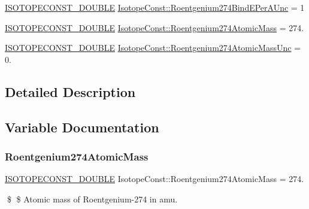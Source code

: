 \begin{DoxyCompactItemize}
\item 
\mbox{\hyperlink{group___isotope_const-_macros_ga8f45a7272ce02c0b4c65c44636ed719a}{I\+S\+O\+T\+O\+P\+E\+C\+O\+N\+S\+T\+\_\+\+D\+O\+U\+B\+LE}} \mbox{\hyperlink{group___isotope_const-_roentgenium-_rg274_gad23f713fd349c5394e547ced151ece70}{Isotope\+Const\+::\+Roentgenium274\+Bind\+E\+Per\+A\+Unc}} = 1
\item 
\mbox{\hyperlink{group___isotope_const-_macros_ga8f45a7272ce02c0b4c65c44636ed719a}{I\+S\+O\+T\+O\+P\+E\+C\+O\+N\+S\+T\+\_\+\+D\+O\+U\+B\+LE}} \mbox{\hyperlink{group___isotope_const-_roentgenium-_rg274_gacc34fede506164a9ad70de76603180a5}{Isotope\+Const\+::\+Roentgenium274\+Atomic\+Mass}} = 274.
\item 
\mbox{\hyperlink{group___isotope_const-_macros_ga8f45a7272ce02c0b4c65c44636ed719a}{I\+S\+O\+T\+O\+P\+E\+C\+O\+N\+S\+T\+\_\+\+D\+O\+U\+B\+LE}} \mbox{\hyperlink{group___isotope_const-_roentgenium-_rg274_ga351115d254a0b292bb631ac08966a09e}{Isotope\+Const\+::\+Roentgenium274\+Atomic\+Mass\+Unc}} = 0.
\end{DoxyCompactItemize}


\subsection{Detailed Description}


\subsection{Variable Documentation}
\mbox{\label{group___isotope_const-_roentgenium-_rg274_gacc34fede506164a9ad70de76603180a5}} 
\subsubsection{\texorpdfstring{Roentgenium274\+Atomic\+Mass}{Roentgenium274AtomicMass}}
{\footnotesize\ttfamily \mbox{\hyperlink{group___isotope_const-_macros_ga8f45a7272ce02c0b4c65c44636ed719a}{I\+S\+O\+T\+O\+P\+E\+C\+O\+N\+S\+T\+\_\+\+D\+O\+U\+B\+LE}} Isotope\+Const\+::\+Roentgenium274\+Atomic\+Mass = 274.}

\$ \$ Atomic mass of Roentgenium-\/274 in amu. \mbox{\label{group___isotope_const-_roentgenium-_rg274_ga351115d254a0b292bb631ac08966a09e}} 
